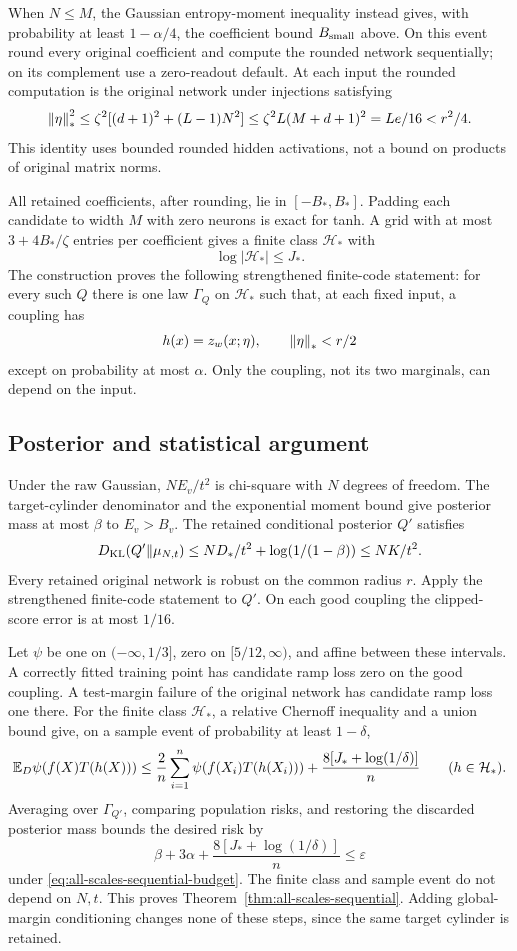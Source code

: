 When $N\le M$, the Gaussian entropy-moment inequality instead gives,
with probability at least $1-\alpha/4$, the coefficient bound
$B_{\rm small}$ above. On this event round every original coefficient
and compute the rounded network sequentially; on its complement use a
zero-readout default. At each input the rounded computation is the
original network under injections satisfying
\[
 \left\|\eta\right\|_*^2
 \le\zeta^2[(d+1)^2+(L-1)N^2]
 \le\zeta^2 L(M+d+1)^2=Le/16<r^2/4.
\]
This identity uses bounded rounded hidden activations, not a bound on
products of original matrix norms.

All retained coefficients, after rounding, lie in $[-B_*,B_*]$.
Padding each candidate to width $M$ with zero neurons is exact for tanh.
A grid with at most $3+4B_*/\zeta$ entries per coefficient gives a finite
class $\mathcal H_*$ with
\begin{equation}\label{eq:all-scales-code}
 \log|\mathcal H_*|\le J_*.
\end{equation}
The construction proves the following strengthened finite-code statement:
for every such $Q$ there is one law $\Gamma_Q$ on $\mathcal H_*$ such
that, at each fixed input, a coupling has
\[
 h(x)=z_w(x;\eta),\qquad \left\|\eta\right\|_*<r/2
\]
except on probability at most $\alpha$. Only the coupling, not its two
marginals, can depend on the input.

\subsection{Posterior and statistical argument}

Under the raw Gaussian, $NE_v/t^2$ is chi-square with $N$ degrees of
freedom. The target-cylinder denominator and the exponential moment
bound give posterior mass at most $\beta$ to $E_v>B_v$. The retained
conditional posterior $Q'$ satisfies
\[
 D_{\rm KL}(Q'\Vert\mu_{N,t})
 \le ND_*/t^2+\log(1/(1-\beta))\le NK/t^2.
\]
Every retained original network is robust on the common radius $r$.
Apply the strengthened finite-code statement to $Q'$. On each good
coupling the clipped-score error is at most $1/16$.

Let $\psi$ be one on $(-\infty,1/3]$, zero on $[5/12,\infty)$,
and affine between these intervals. A correctly fitted training point
has candidate ramp loss zero on the good coupling. A test-margin
failure of the original network has candidate ramp loss one there.
For the finite class $\mathcal H_*$, a relative Chernoff inequality
and a union bound give, on a sample event of probability at least
$1-\delta$,
\[
 \mathbb E_D\psi(f(X)T(h(X)))
 \le \frac2n\sum_{i=1}^n\psi(f(X_i)T(h(X_i)))
       +\frac{8[J_*+\log(1/\delta)]}{n}
 \qquad(h\in\mathcal H_*).
\]
Averaging over $\Gamma_{Q'}$, comparing population risks, and restoring
the discarded posterior mass bounds the desired risk by
\[
 \beta+3\alpha+\frac{8[J_*+\log(1/\delta)]}{n}
 \le\varepsilon
\]
under \eqref{eq:all-scales-sequential-budget}. The finite class and sample
event do not depend on $N,t$. This proves
Theorem~\ref{thm:all-scales-sequential}. Adding global-margin conditioning
changes none of these steps, since the same target cylinder is retained.

